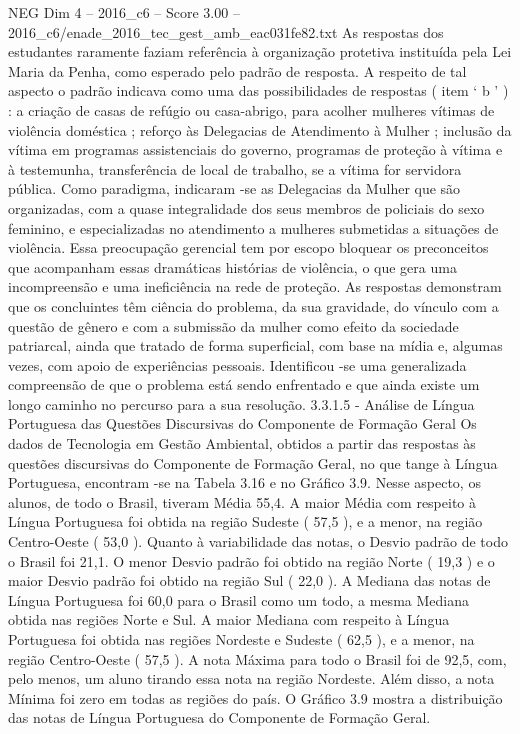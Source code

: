 \begin{textsample}{NEG Dim 4 – 2016\_c6 – Score 3.00 – 2016\_c6/enade\_2016\_tec\_gest\_amb\_eac031fe82.txt}
As respostas dos estudantes raramente faziam referência à organização protetiva instituída pela Lei Maria da Penha, como esperado pelo padrão de resposta.
A respeito de tal aspecto o padrão indicava como uma das possibilidades de respostas ( item ‘ b ’ ) : a criação de casas de refúgio ou casa-abrigo, para acolher mulheres vítimas de violência doméstica ; reforço às Delegacias de Atendimento à Mulher ; inclusão da vítima em programas assistenciais do governo, programas de proteção à vítima e à testemunha, transferência de local de trabalho, se a vítima for servidora pública.
Como paradigma, indicaram -se as Delegacias da Mulher que são organizadas, com a quase integralidade dos seus membros de policiais do sexo feminino, e especializadas no atendimento a mulheres submetidas a situações de violência.
Essa preocupação gerencial tem por escopo bloquear os preconceitos que acompanham essas dramáticas histórias de violência, o que gera uma incompreensão e uma ineficiência na rede de proteção.
As respostas demonstram que os concluintes têm ciência do problema, da sua gravidade, do vínculo com a questão de gênero e com a submissão da mulher como efeito da sociedade patriarcal, ainda que tratado de forma superficial, com base na mídia e, algumas vezes, com apoio de experiências pessoais.
Identificou -se uma generalizada compreensão de que o problema está sendo enfrentado e que ainda existe um longo caminho no percurso para a sua resolução. 3.3.1.5 - Análise de Língua Portuguesa das Questões Discursivas do Componente de Formação Geral Os dados de Tecnologia em Gestão Ambiental, obtidos a partir das respostas às questões discursivas do Componente de Formação Geral, no que tange à Língua Portuguesa, encontram -se na Tabela 3.16 e no Gráfico 3.9.
Nesse aspecto, os alunos, de todo o Brasil, tiveram Média 55,4.
A maior Média com respeito à Língua Portuguesa foi obtida na região Sudeste ( 57,5 ), e a menor, na região Centro-Oeste ( 53,0 ).
Quanto à variabilidade das notas, o Desvio padrão de todo o Brasil foi 21,1.
O menor Desvio padrão foi obtido na região Norte ( 19,3 ) e o maior Desvio padrão foi obtido na região Sul ( 22,0 ).
A Mediana das notas de Língua Portuguesa foi 60,0 para o Brasil como um todo, a mesma Mediana obtida nas regiões Norte e Sul.
A maior Mediana com respeito à Língua Portuguesa foi obtida nas regiões Nordeste e Sudeste ( 62,5 ), e a menor, na região Centro-Oeste ( 57,5 ).
A nota Máxima para todo o Brasil foi de 92,5, com, pelo menos, um aluno tirando essa nota na região Nordeste.
Além disso, a nota Mínima foi zero em todas as regiões do país.
O Gráfico 3.9 mostra a distribuição das notas de Língua Portuguesa do Componente de Formação Geral.

\end{textsample}
